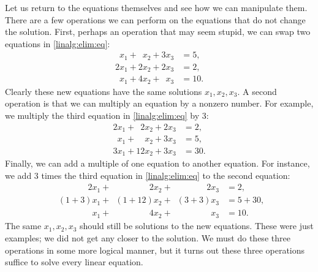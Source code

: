 \medskip

Let us return to the equations themselves and see how we can manipulate
them.
There are a few operations we can perform on the equations that do not change
the solution.  First, perhaps an operation that may seem stupid, we can swap
two equations in \eqref{linalg:elim:eq}:
\begin{equation*}
\begin{aligned}
\phantom{9} x_1 + \phantom{9} x_2 +           3 x_3 & = 5 , \\
          2 x_1 +           2 x_2 +           2 x_3 & = 2 , \\
\phantom{9} x_1 +           4 x_2 + \phantom{9} x_3 & = 10 .
\end{aligned}
\end{equation*}
Clearly these new equations have the same solutions $x_1,x_2,x_3$.
A second operation is that we can multiply an equation by a nonzero number.  For
example, we multiply the third equation in \eqref{linalg:elim:eq}
by 3:
\begin{equation*}
\begin{aligned}
          2 x_1 + \phantom{9}  2 x_2 + 2 x_3 & = 2 , \\
\phantom{9} x_1 + \phantom{99}   x_2 + 3 x_3 & = 5 , \\
          3 x_1 +             12 x_2 + 3 x_3 & = 30 .
\end{aligned}
\end{equation*}
Finally, we can add a multiple of one equation to another equation.
For instance, we add 3 times the third equation in \eqref{linalg:elim:eq}
to the second equation:
\begin{equation*}
\begin{aligned}
\phantom{(1+3)} 2 x_1 + \phantom{(1+12)}  2 x_2 + \phantom{(3+3)} 2 x_3 & = 2 , \\
\phantom{2} (1+3) x_1 + \phantom{2}(1+12)   x_2 + \phantom{2} (3+3) x_3 & = 5+30 , \\
\phantom{2 (1+3)} x_1 + \phantom{(1+12)}  4 x_2 + \phantom{(3+3) 2} x_3 & = 10 .
\end{aligned}
\end{equation*}
The same $x_1,x_2,x_3$ should still be solutions
to the new equations.
These were just examples; we did not get any closer to the solution.
We must do these three operations in some more logical manner,
but it turns out
these three operations suffice to solve every linear equation.


